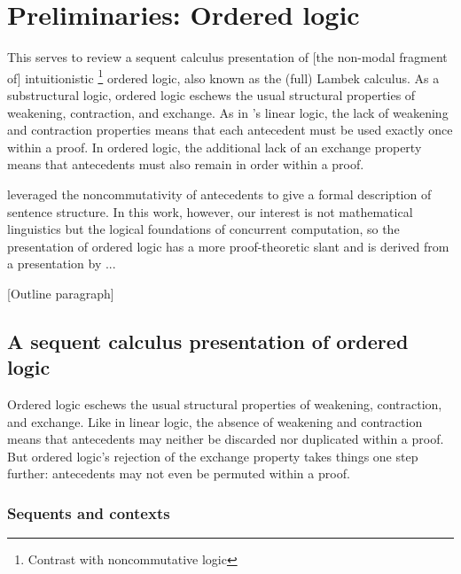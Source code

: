 \chapter{Preliminaries: Ordered logic}\label{ch:ordered-logic}



This  serves to review a sequent calculus presentation of [the non-modal fragment of]
intuitionistic%
\footnote{Contrast with noncommutative logic}
ordered logic, also known as the (full) Lambek calculus\autocites{Lambek:AMM58}{Lambek:SLIM61}.
As a substructural logic, ordered logic eschews the usual structural properties of weakening, contraction, and exchange.
As in \citeauthor{Girard:TCS??}'s linear logic\autocite{Girard:TCS??}, the lack of weakening and contraction properties means that each antecedent must be used exactly once within a proof.
In ordered logic, the additional lack of an exchange property means that antecedents must also remain in order within a proof.

 leveraged the noncommutativity of antecedents to give a formal description of sentence structure.
In this work, however, our interest is not mathematical linguistics but the logical foundations of concurrent computation, so the presentation of ordered logic has a more proof-theoretic slant and is derived from a presentation by ...


[Outline paragraph]


\section{A sequent calculus presentation of ordered logic}

Ordered logic eschews the usual structural properties of weakening, contraction, and exchange.
Like in linear logic, the absence of weakening and contraction means that antecedents may neither be discarded nor duplicated within a proof.
But ordered logic's rejection of the exchange property takes things one step further: antecedents may not even be permuted within a proof.

\subsection{Sequents and contexts}

